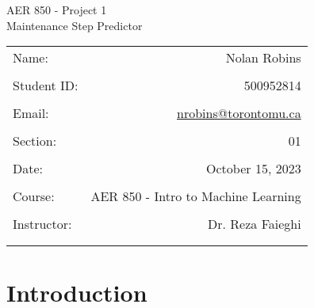 \documentclass{article}
\title{}
\author{}
\date{}
\begin{document}
%



\begin{center}

    \LARGE{AER 850 - Project 1\\Maintenance Step Predictor}
    \vspace{4cm}\\

    \normalsize
    \begin{tabular}{l r}
        Name: & Nolan Robins \\ 
        \\
        Student ID: & 500952814\\
        \\
        Email: & \href{mailto:nrobins@torontomu.ca}{nrobins@torontomu.ca}\\
        \\
        Section: & 01\\
        \\
        Date: & October 15, 2023 \\
        \vspace{4cm}
        \\
        Course: & AER 850 - Intro to Machine Learning\\
        \\
        Instructor: & Dr. Reza Faieghi\\
        \vspace{4cm}\\
        \thispagestyle{empty}%
    \end{tabular}

\end{center}





\clearpage


\tableofcontents



\clearpage

\section{Introduction}
\end{document}
